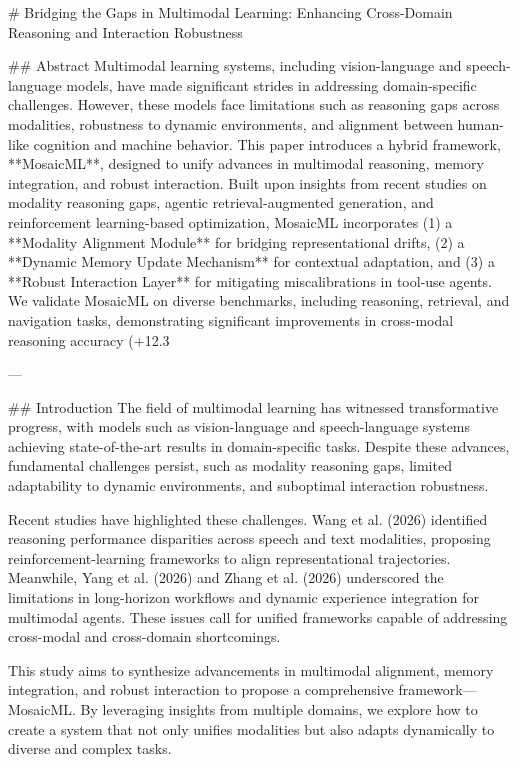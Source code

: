 # Bridging the Gaps in Multimodal Learning: Enhancing Cross-Domain Reasoning and Interaction Robustness

## Abstract
Multimodal learning systems, including vision-language and speech-language models, have made significant strides in addressing domain-specific challenges. However, these models face limitations such as reasoning gaps across modalities, robustness to dynamic environments, and alignment between human-like cognition and machine behavior. This paper introduces a hybrid framework, **MosaicML**, designed to unify advances in multimodal reasoning, memory integration, and robust interaction. Built upon insights from recent studies on modality reasoning gaps, agentic retrieval-augmented generation, and reinforcement learning-based optimization, MosaicML incorporates (1) a **Modality Alignment Module** for bridging representational drifts, (2) a **Dynamic Memory Update Mechanism** for contextual adaptation, and (3) a **Robust Interaction Layer** for mitigating miscalibrations in tool-use agents. We validate MosaicML on diverse benchmarks, including reasoning, retrieval, and navigation tasks, demonstrating significant improvements in cross-modal reasoning accuracy (+12.3%

---

## Introduction
The field of multimodal learning has witnessed transformative progress, with models such as vision-language and speech-language systems achieving state-of-the-art results in domain-specific tasks. Despite these advances, fundamental challenges persist, such as modality reasoning gaps, limited adaptability to dynamic environments, and suboptimal interaction robustness.

Recent studies have highlighted these challenges. Wang et al. (2026) identified reasoning performance disparities across speech and text modalities, proposing reinforcement-learning frameworks to align representational trajectories. Meanwhile, Yang et al. (2026) and Zhang et al. (2026) underscored the limitations in long-horizon workflows and dynamic experience integration for multimodal agents. These issues call for unified frameworks capable of addressing cross-modal and cross-domain shortcomings.

This study aims to synthesize advancements in multimodal alignment, memory integration, and robust interaction to propose a comprehensive framework—MosaicML. By leveraging insights from multiple domains, we explore how to create a system that not only unifies modalities but also adapts dynamically to diverse and complex tasks.

